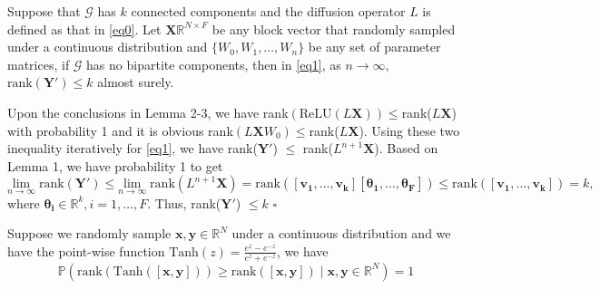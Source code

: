 \documentclass{article}
\newcommand\doubleP{\mathbb{P}}
\newenvironment{theorem}[2][Theorem]{\begin{trivlist}
		\item[\hskip \labelsep {\bfseries #1}\hskip \labelsep {\bfseries #2.}]}{\end{trivlist}}
\newenvironment{lemma}[2][Lemma]{\begin{trivlist}
		\item[\hskip \labelsep {\bfseries #1}\hskip \labelsep {\bfseries #2.}]}{\end{trivlist}}
\newenvironment{proof}{{\noindent\it Proof}\quad}{\hfill $\square$\par}
\begin{document}
\begin{theorem} 1
Suppose that $\mathcal{G}$ has $k$ connected components and the diffusion operator $L$ is defined as that in \eqref{eq0}. Let $\bm{X} \mathbb{R}^{N \times F}$ be any block vector that randomly sampled under a continuous distribution and $\{W_0, W_1, \dots, W_n\}$ be any set of parameter matrices, if $\mathcal{G}$ has no bipartite components, then in \eqref{eq1}, as $n \to \infty$, $\text{rank}(\bm{Y'}) \leq k$ almost surely.
\end{theorem}	

\begin{proof}
Upon the conclusions in Lemma 2-3, we have rank$\left(\text{ReLU} (L \textbf{X})\right) \leq$rank($L \textbf{X}$) with probability 1 and it is obvious rank$(L \bm{X} W_0) \leq$rank($L \bm{X}$). Using these two inequality iteratively for \eqref{eq1}, we have rank($\bm{Y'}$) $\leq$ rank($L^{n+1}  \bm{X}$). Based on Lemma 1, we have probability 1 to get
\begin{equation*} \label{eq3}
\underset{n \rightarrow \infty }{\text{lim}} \; \text{rank}(\bm{Y'}) \leq \underset{n \rightarrow \infty }{\text{lim}}\; \text{rank}(L^{n+1} \bm{X}) = \text{rank} ([\bm{v_1},\dots, \bm{v_k}] [\bm{\theta_1},\dots, \bm{\theta_F}]) \leq \text{rank}([\bm{v_1},\dots, \bm{v_k}]) = k,
\end{equation*}
where $\bm{\theta_i} \in \mathbb{R}^k, i=1,\dots,F$. Thus, rank($\bm{Y'}$) $\leq k$
\end{proof}



\begin{theorem} 2
Suppose we randomly sample $\bm{x}, \bm{y} \in \mathbb{R}^N$ under a continuous distribution and we have the point-wise function $\text{Tanh}(z) = \frac{e^z - e^{-z}}{e^z + e^{-z}}$, we have
$$\doubleP(\text{rank}\left(\text{Tanh}([\bm{x},\bm{y}])\right) \geq \text{rank}([\bm{x},\bm{y}]) \;|\; \bm{x},\bm{y} \in \mathbb{R}^N) = 1$$
\end{theorem}
\end{document}
